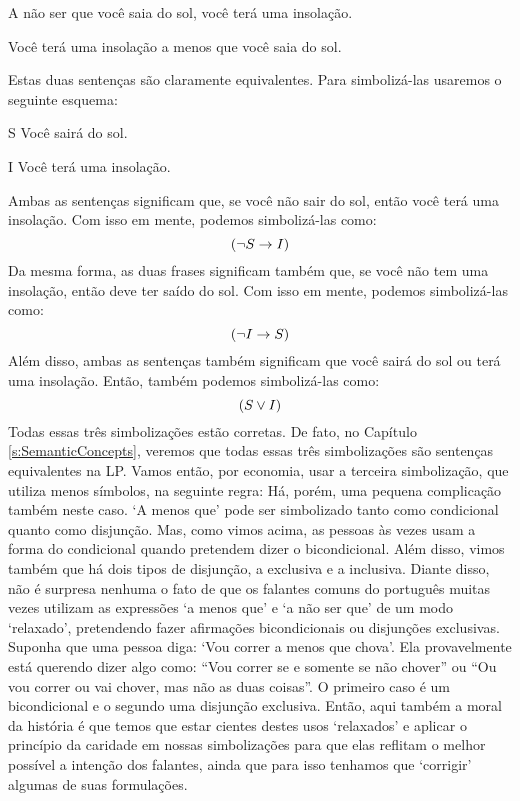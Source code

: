 \begin{earg}
\item[\ex{unless1}] A não ser que você saia do sol, você terá uma insolação.
\item[\ex{unless2}] Você terá uma insolação a menos que você saia do sol.
\end{earg}
Estas duas sentenças são claramente equivalentes.
Para simbolizá-las usaremos o seguinte esquema:
	\begin{ekey}
		\item[S] Você sairá do sol.
		\item[I] Você terá uma insolação.
	\end{ekey}
Ambas as sentenças significam que, se você não sair do sol, então você terá uma insolação.
Com isso em mente, podemos simbolizá-las como:
$$(\neg S \rightarrow I)$$
Da mesma forma, as duas frases significam também que, se você não tem uma insolação, então deve ter saído do sol.
Com isso em mente, podemos simbolizá-las como:
$$(\neg I \rightarrow S)$$
Além disso, ambas as sentenças também significam que você sairá do sol ou terá uma insolação. Então, também podemos simbolizá-las como:
$$(S \vee I)$$
Todas essas três simbolizações estão corretas.
De fato, no Capítulo \ref{s:SemanticConcepts}, veremos que todas essas três simbolizações são sentenças equivalentes na LP.
Vamos então, por economia, usar a terceira simbolização, que utiliza menos símbolos, na seguinte regra:
Há, porém, uma pequena complicação também neste caso.
`A menos que' pode ser simbolizado tanto como condicional quanto como disjunção.
Mas, como vimos acima, as pessoas às vezes usam a forma do condicional quando pretendem dizer o bicondicional.
Além disso, vimos também que há dois tipos de disjunção, a exclusiva e a inclusiva.
Diante disso, não é surpresa nenhuma o fato de que os falantes comuns do português muitas vezes utilizam as expressões `a menos que' e `a não ser que' de um modo `relaxado', pretendendo fazer afirmações bicondicionais ou disjunções exclusivas.
Suponha que uma pessoa diga:
`Vou correr a menos que chova'.
Ela provavelmente está querendo dizer algo como:
``Vou correr se e somente se não chover'' ou ``Ou vou correr ou vai chover, mas não as duas coisas''.
O primeiro caso é um bicondicional e o segundo uma disjunção exclusiva.
Então, aqui também a moral da história é que temos que estar cientes destes usos `relaxados' e aplicar o princípio da caridade em nossas simbolizações para que elas reflitam o melhor possível a intenção dos falantes, ainda que para isso tenhamos que `corrigir' algumas de suas formulações.


